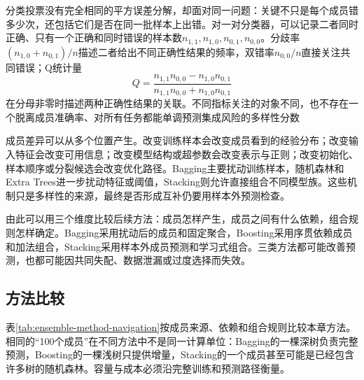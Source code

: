 分类投票没有完全相同的平方误差分解，却面对同一问题：关键不只是每个成员错多少次，还包括它们是否在同一批样本上出错。对一对分类器，可以记录二者同时正确、只有一个正确和同时错误的样本数$n_{1,1},n_{1,0},n_{0,1},n_{0,0}$。分歧率$(n_{1,0}+n_{0,1})/n$描述二者给出不同正确性结果的频率，双错率$n_{0,0}/n$直接关注共同错误；Q统计量
\[
  Q=
  \frac{n_{1,1}n_{0,0}-n_{1,0}n_{0,1}}
       {n_{1,1}n_{0,0}+n_{1,0}n_{0,1}}
\]
在分母非零时描述两种正确性结果的关联。不同指标关注的对象不同，也不存在一个脱离成员准确率、对所有任务都能单调预测集成风险的多样性分数

成员差异可以从多个位置产生。改变训练样本会改变成员看到的经验分布；改变输入特征会改变可用信息；改变模型结构或超参数会改变表示与正则；改变初始化、样本顺序或分裂候选会改变优化路径。Bagging主要扰动训练样本，随机森林和Extra Trees进一步扰动特征或阈值，Stacking则允许直接组合不同模型族。这些机制只是多样性的来源，最终是否形成互补仍要用样本外预测检查。

由此可以用三个维度比较后续方法：成员怎样产生，成员之间有什么依赖，组合规则怎样确定。Bagging采用扰动后的成员和固定聚合，Boosting采用序贯依赖成员和加法组合，Stacking采用样本外成员预测和学习式组合。三类方法都可能改善预测，也都可能因共同失配、数据泄漏或过度选择而失效。


\subsection{方法比较}
\label{sec:ensemble-method-comparison}

表\ref{tab:ensemble-method-navigation}按成员来源、依赖和组合规则比较本章方法。相同的“100个成员”在不同方法中不是同一计算单位：Bagging的一棵深树负责完整预测，Boosting的一棵浅树只提供增量，Stacking的一个成员甚至可能是已经包含许多树的随机森林。容量与成本必须沿完整训练和预测路径衡量。

